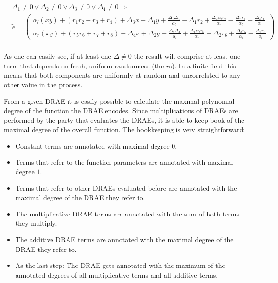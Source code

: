 \begin{align*}
  &
  \Delta_1 \neq 0 \vee \Delta_2 \neq 0 \vee
  \Delta_3 \neq 0 \vee \Delta_4 \neq 0
  \Rightarrow \\
  &
  \widetilde{e} =
  \begin{pmatrix}
    \alpha_l(xy) + (r_1r_2 + r_3 + r_4)
    + \Delta_3x + \Delta_1y
    + \frac{\Delta_1\Delta_3}{\alpha_l}
    - \Delta_1r_2
    + \frac{\Delta_2\alpha_lr_2}{\alpha_r}
    - \frac{\Delta_3r_1}{\alpha_l}
    + \frac{\Delta_4r_1}{\alpha_r}
    \\
    \alpha_r(xy) + (r_5r_6 + r_7 + r_8)
    + \Delta_4x + \Delta_2y
    + \frac{\Delta_2\Delta_4}{\alpha_l}
    + \frac{\Delta_1\alpha_lr_6}{\alpha_r}
    - \Delta_2r_6
    + \frac{\Delta_3r_5}{\alpha_r}
    - \frac{\Delta_4r_5}{\alpha_l}
  \end{pmatrix} \\
\end{align*}

\noindent{}As one can easily see, if at least one $\Delta \neq 0$ the result
will comprise at least one term that depends on fresh, uniform randomness (the
$r$s). In a finite field this means that both components are uniformly at random
and uncorrelated to any other value in the process.


\label{sec:max-poly-degree}

From a given DRAE it is easily possible to calculate the maximal polynomial
degree of the function the DRAE encodes. Since multiplications of DRAEs are
performed by the party that evaluates the DRAEs, it is able to keep book of the
maximal degree of the overall function. The bookkeeping is very straightforward:

\begin{itemize}

  \item Constant terms are annotated with maximal degree $0$.

  \item Terms that refer to the function parameters are annotated with maximal
    degree $1$.

  \item Terms that refer to other DRAEs evaluated before are annotated with the
    maximal degree of the DRAE they refer to.

  \item The multiplicative DRAE terms are annotated with the sum of both terms
    they multiply.

  \item The additive DRAE terms are annotated with the maximal degree of the
    DRAE they refer to.

  \item As the last step: The DRAE gets annotated with the maximum of the
    annotated degrees of all multiplicative terms and all additive terms.

\end{itemize}

